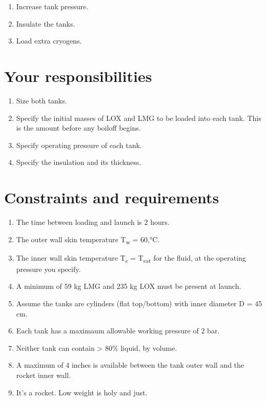 \documentclass[
]{book}
\providecommand{\tightlist}{%
  \setlength{\itemsep}{0pt}\setlength{\parskip}{0pt}}
\begin{document}
\begin{enumerate}
\def\labelenumi{\arabic{enumi}.}
\tightlist
\item
  Increase tank pressure.
\item
  Insulate the tanks.
\item
  Load extra cryogens.
\end{enumerate}

\hypertarget{your-responsibilities}{%
\section{Your responsibilities}\label{your-responsibilities}}

\begin{enumerate}
\def\labelenumi{\arabic{enumi}.}
\tightlist
\item
  Size both tanks.
\item
  Specify the initial masses of LOX and LMG to be loaded into each tank. This is the amount before any boiloff begins.
\item
  Specify operating pressure of each tank.
\item
  Specify the insulation and its thickness.
\end{enumerate}

\hypertarget{constraints-and-requirements}{%
\section{Constraints and requirements}\label{constraints-and-requirements}}

\begin{enumerate}
\def\labelenumi{\arabic{enumi}.}
\tightlist
\item
  The time between loading and launch is 2 hours.
\item
  The outer wall skin temperature T\textsubscript{w} = 60,°C.
\item
  The inner wall skin temperature T\textsubscript{s} = T\textsubscript{sat} for the fluid, at the operating pressure you specify.
\item
  A minimum of 59 kg LMG and 235 kg LOX must be present at launch.
\item
  Assume the tanks are cylinders (flat top/bottom) with inner diameter D = 45 cm.
\item
  Each tank has a maximaum allowable working pressure of 2 bar.
\item
  Neither tank can contain \textgreater{} 80\% liquid, by volume.
\item
  A maximum of 4 inches is available between the tank outer wall and the rocket inner wall.
\item
  It's a rocket. Low weight is holy and just.
\end{enumerate}
\end{document}
